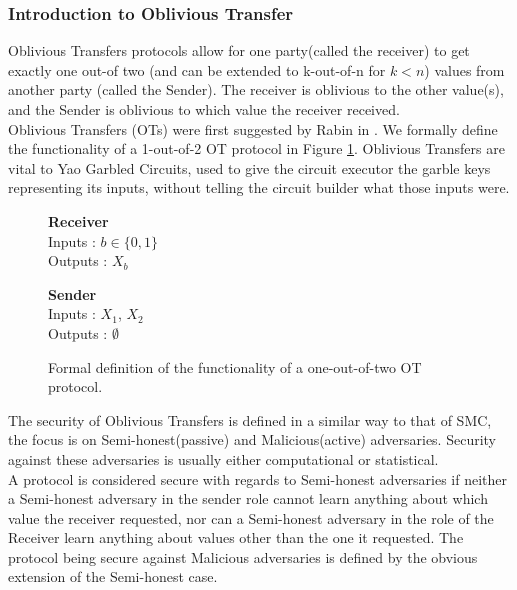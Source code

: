 \documentclass[a4paper,11pt]{article}
\begin{document}
			\subsubsection{Introduction to Oblivious Transfer}
				Oblivious Transfers protocols allow for one party(called the receiver) to get exactly one out-of two (and can be extended to k-out-of-n for $k < n$) values from another party (called the Sender). The receiver is oblivious to the other value(s), and the Sender is oblivious to which value the receiver received.\\

				Oblivious Transfers (OTs) were first suggested by Rabin in \cite{Rabin81}. We formally define the functionality of a 1-out-of-2 OT protocol in Figure \ref{fig:OTformalDef}. Oblivious Transfers are vital to Yao Garbled Circuits, used to give the circuit executor the garble keys representing its inputs, without telling the circuit builder what those inputs were.\\

				\begin{figure}[!htb]
					\centering
					\begin{minipage}{0.45\textwidth}
						\centering
						\textbf{Receiver}\\
						Inputs : $b \in \{0, 1\}$\\
						Outputs : $X_b$\\
					\end{minipage}
					\begin{minipage}{0.45\textwidth}
						\centering
						\textbf{Sender}\\
						Inputs : $X_1$, $X_2$\\
						Outputs : $\emptyset$\\
					\end{minipage}

					\caption{ Formal definition of the functionality of a one-out-of-two OT protocol.\label{fig:OTformalDef}}
				\end{figure}
      
				The security of Oblivious Transfers is defined in a similar way to that of SMC, the focus is on Semi-honest(passive) and Malicious(active) adversaries. Security against these adversaries is usually either computational or statistical.\\

				A protocol is considered secure with regards to Semi-honest adversaries if neither a Semi-honest adversary in the sender role cannot learn anything about which value the receiver requested, nor can a Semi-honest adversary in the role of the Receiver learn anything about values other than the one it requested. The protocol being secure against Malicious adversaries is defined by the obvious extension of the Semi-honest case.\\
\end{document}
